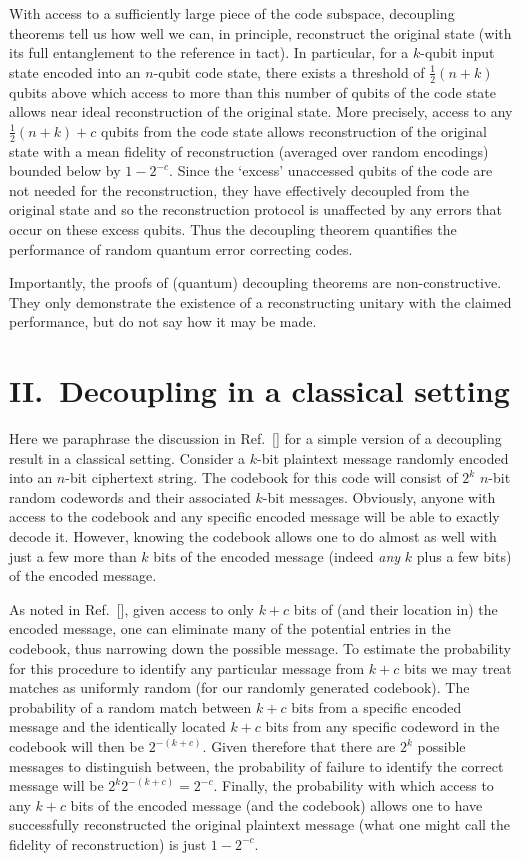 \documentclass[twocolumn,aps,showpacs,prl]{revtex4}
\begin{document}
With access to a sufficiently large piece of the code subspace,
decoupling theorems tell us how well we can, in principle,
reconstruct the original state (with its full entanglement to the
reference in tact). In particular, for a $k$-qubit input state encoded
into an $n$-qubit code state, there exists a threshold of $\frac{1}{2}(n+k)$
qubits above which access to more than this number of qubits of the
code state allows near ideal reconstruction of the original state.
More precisely, access to any $\frac{1}{2}(n+k)+c$ qubits from the code
state allows reconstruction \cite{Hayden07app} of the original state with
a mean fidelity of reconstruction (averaged over random encodings) bounded
below by $1-2^{-c}$. Since the `excess' unaccessed qubits of the code
are not needed for the reconstruction, they have effectively decoupled
from the original state and so the reconstruction protocol is unaffected
by any errors that occur on these excess qubits. Thus the decoupling
theorem quantifies the performance of random quantum error correcting
codes.

Importantly, the proofs of (quantum) decoupling theorems are
non-constructive. They only demonstrate the existence of a reconstructing
unitary with the claimed performance, but do not say how it may be
made.

\section{II.\ Decoupling in a classical setting}

Here we paraphrase the discussion in Ref.~[] for a
simple version of a decoupling result in a classical setting. Consider
a $k$-bit plaintext message randomly encoded into an $n$-bit ciphertext
string. The codebook for this code will consist of $2^k$ $n$-bit random
codewords and their associated $k$-bit messages. Obviously, anyone with
access to the codebook and any specific encoded message will be able to
exactly decode it. However, knowing the codebook allows one to do almost
as well with just a few more than $k$ bits of the encoded message 
(indeed {\it any\/} $k$ plus a few bits) of the encoded message.

As noted in Ref.~[], given access to only $k+c$ bits
of (and their location in) the encoded message, one can eliminate
many of the potential entries in the codebook, thus narrowing down the
possible message. To estimate the probability for this procedure
to identify any particular message from $k+c$ bits we may treat matches
as uniformly random (for our randomly generated codebook).
The probability of a random match between $k+c$ bits from a specific
encoded message and the identically located $k+c$ bits from any specific
codeword in the codebook will then be $2^{-(k+c)}$. Given therefore that
there are $2^k$ possible messages to distinguish between, the probability
of failure to identify the correct message will be $2^k 2^{-(k+c)}=2^{-c}$.
Finally, the probability with which access to any $k+c$ bits of
the encoded message (and the codebook) allows one to have successfully
reconstructed the original plaintext message (what one might call the
fidelity of reconstruction) is just $1-2^{-c}$.
\end{document}
